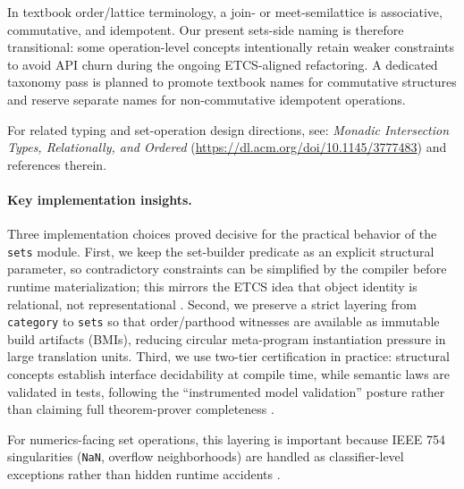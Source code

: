\documentclass[11pt, a4paper]{report}
\begin{document}
In textbook order/lattice terminology, a join- or meet-semilattice is
associative, commutative, and idempotent. Our present sets-side naming is
therefore transitional: some operation-level concepts intentionally retain
weaker constraints to avoid API churn during the ongoing ETCS-aligned
refactoring. A dedicated taxonomy pass is planned to promote textbook names for
commutative structures and reserve separate names for non-commutative
idempotent operations.

For related typing and set-operation design directions, see:
\emph{Monadic Intersection Types, Relationally, and Ordered}
(\url{https://dl.acm.org/doi/10.1145/3777483}) and references therein.

\paragraph{Key implementation insights.}
Three implementation choices proved decisive for the practical behavior of the
\texttt{sets} module.
First, we keep the set-builder predicate as an explicit structural parameter,
so contradictory constraints can be simplified by the compiler before runtime
materialization; this mirrors the ETCS idea that object identity is relational,
not representational \cite{lawvere1964etcs, lawvere2003sets}.
Second, we preserve a strict layering from \texttt{category} to
\texttt{sets} so that order/parthood witnesses are available as immutable
build artifacts (BMIs), reducing circular meta-program instantiation pressure
in large translation units.
Third, we use two-tier certification in practice: structural concepts establish
interface decidability at compile time, while semantic laws are validated in
tests, following the ``instrumented model validation'' posture rather than
claiming full theorem-prover completeness \cite{ClaessenHughes2000, Duvall2007}.

For numerics-facing set operations, this layering is important because
IEEE 754 singularities (\texttt{NaN}, overflow neighborhoods) are handled as
classifier-level exceptions rather than hidden runtime accidents
\cite{ieee754_2019, higham2002accuracy}.
\end{document}
